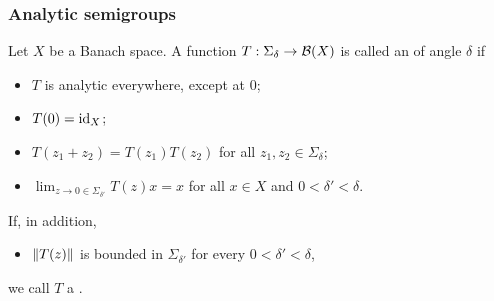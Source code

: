 \subsubsection{Analytic semigroups}
\begin{definition}
Let $X$ be a Banach space. A function $T: \Sigma_\delta \to \operatorname{\mathcal{B}}(X)$ is called an  of angle $\delta$ if
\begin{itemize}
\item $T$ is analytic everywhere, except at $0$;
\item $T(0) = \operatorname{id}_X$;
\item $T(z_1 + z_2) = T(z_1)T(z_2)$ for all $z_1,z_2\in \Sigma_\delta$;
\item $\lim_{z\to 0 \in \Sigma_{\delta'}}T(z)x = x$ for all $x\in X$ and $0<\delta'<\delta$.
\end{itemize}
If, in addition,
\begin{itemize}
\item $\lVert T(z)\rVert$ is bounded in $\Sigma_{\delta'}$ for every $0<\delta'<\delta$,
\end{itemize}
we call $T$ a .
\end{definition}

